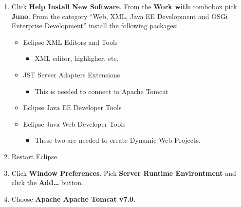 \documentclass[]{report}
\begin{document}
\begin{enumerate}
\def\labelenumi{\arabic{enumi}.}
\item
  Click \textbf{Help \textbar{} Install New Software}. From the
  \textbf{Work with} combobox pick \textbf{Juno}. From the category
  ``Web, XML, Java EE Development and OSGi Enterprise Development''
  install the following packages:

  \begin{itemize}
  \itemsep1pt\parskip0pt
  \item
    Eclipse XML Editors and Tools

    \begin{itemize}
    \itemsep1pt\parskip0pt
    \item
      XML editor, highligher, etc.
    \end{itemize}
  \item
    JST Server Adapters Extensions

    \begin{itemize}
    \itemsep1pt\parskip0pt
    \item
      This is needed to connect to Apache Tomcat
    \end{itemize}
  \item
    Eclipse Java EE Developer Tools
  \item
    Eclipse Java Web Developer Tools

    \begin{itemize}
    \itemsep1pt\parskip0pt
    \item
      These two are needed to create Dynamic Web Projects.
    \end{itemize}
  \end{itemize}
\item
  Restart Eclipse.
\item
  Click \textbf{Window \textbar{} Preferences}. Pick \textbf{Server
  \textbar{} Runtime Environtment} and click the \textbf{Add\ldots{}}
  button.
\item
  Choose \textbf{Apache \textbar{} Apache Tomcat v7.0}.


\end{enumerate}
\end{document}
